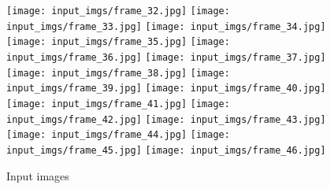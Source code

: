 \documentclass{paper}
\begin{document}
\begin{appendix}
\begin{figure}
					\texttt{[image: input\_imgs/frame\_32.jpg]}
					\texttt{[image: input\_imgs/frame\_33.jpg]}
					\texttt{[image: input\_imgs/frame\_34.jpg]}
					\texttt{[image: input\_imgs/frame\_35.jpg]}
					\texttt{[image: input\_imgs/frame\_36.jpg]}
					\texttt{[image: input\_imgs/frame\_37.jpg]}
					\texttt{[image: input\_imgs/frame\_38.jpg]}
					\texttt{[image: input\_imgs/frame\_39.jpg]}
					\texttt{[image: input\_imgs/frame\_40.jpg]}
					\texttt{[image: input\_imgs/frame\_41.jpg]}
					\texttt{[image: input\_imgs/frame\_42.jpg]}
					\texttt{[image: input\_imgs/frame\_43.jpg]}
					\texttt{[image: input\_imgs/frame\_44.jpg]}
					\texttt{[image: input\_imgs/frame\_45.jpg]}
					\texttt{[image: input\_imgs/frame\_46.jpg]}
					\caption{Input images}
					\label{input_images}														
				\end{figure}
	\end{appendix}
\end{document}
